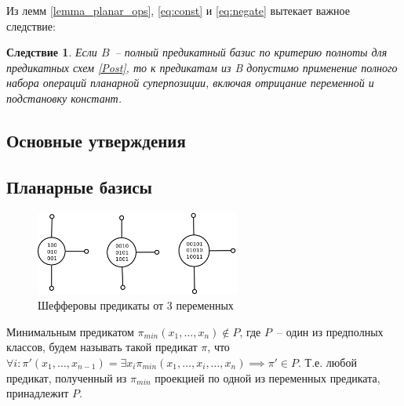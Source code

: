 \documentclass[12pt]{extarticle}
\newtheorem{corollary}[theorem]{Следствие}
\newenvironment{definition}[1][Определение.]{\begin{trivlist}
\item[\hskip \labelsep {\bfseries #1}]}{\end{trivlist}}
\begin{document}
Из лемм \ref{lemma_planar_ops}, \ref{eq:const} и \ref{eq:negate} вытекает важное следствие:
\begin{corollary}
\label{can_use_ops}
Если $B$~-- полный предикатный базис по критерию полноты для предикатных схем
\ref{Post}, то к предикатам из B допустимо применение полного набора операций 
планарной суперпозиции, включая отрицание переменной и подстановку констант.
\end{corollary}

\subsection{Основные утверждения}
\label{planar_chapter}
\subsection{Планарные базисы}

\begin{figure}[htb]
\centering
\includegraphics[width=0.6\textwidth]{scheff3.png}
\caption{Шефферовы предикаты от 3 переменных}
\label{fig:sheff}
\end{figure}

\label{planar_basis}

\begin{definition}
Минимальным предикатом $\pi_{min}(x_1, \dots, x_n) \notin P$, где $P$~-- один из предполных классов, будем называть такой 
предикат $\pi$, что $\forall i: \pi'(x_1, \dots, x_{n-1}) = \exists x_i \pi_{min}(x_1, \dots, x_{i}, \dots, x_n) \implies \pi' \in P$. 
Т.е. любой предикат,
полученный из $\pi_{min}$ проекцией по одной из переменных предиката, принадлежит $P$.
\end{definition}
\end{document}
